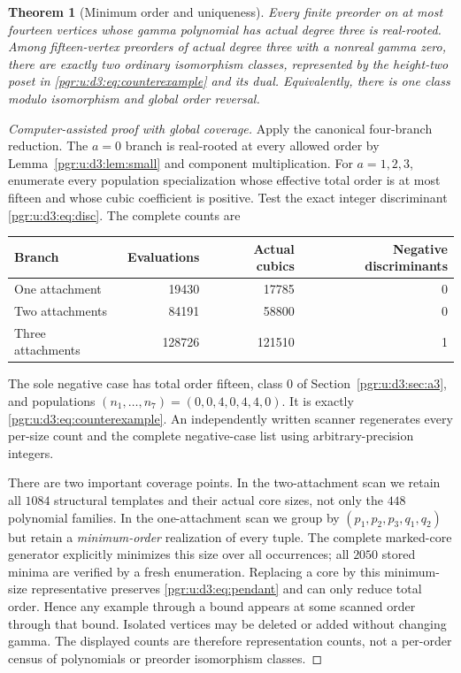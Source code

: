 \documentclass[11pt]{article}
\numberwithin{equation}{section}
\newtheorem{theorem}{Theorem}[section]\newtheorem{lemma}[theorem]{Lemma}\newtheorem{proposition}[theorem]{Proposition}\newtheorem{corollary}[theorem]{Corollary}
\theoremstyle{definition}\newtheorem{definition}[theorem]{Definition}\newtheorem{remark}[theorem]{Remark}
\begin{document}
\begin{theorem}[Minimum order and uniqueness]\label{pgr:u:d3:thm:minimum}
Every finite preorder on at most fourteen vertices whose gamma polynomial has actual degree three is real-rooted. Among fifteen-vertex preorders of actual degree three with a nonreal gamma zero, there are exactly two ordinary isomorphism classes, represented by the height-two poset in \eqref{pgr:u:d3:eq:counterexample} and its dual. Equivalently, there is one class modulo isomorphism and global order reversal.
\end{theorem}
\begin{proof}[Computer-assisted proof with global coverage]
Apply the canonical four-branch reduction. The $a=0$ branch is real-rooted at every allowed order by Lemma~\ref{pgr:u:d3:lem:small} and component multiplication. For $a=1,2,3$, enumerate every population specialization whose effective total order is at most fifteen and whose cubic coefficient is positive. Test the exact integer discriminant \eqref{pgr:u:d3:eq:disc}. The complete counts are
\begin{center}
\begin{tabular}{lrrr}
\toprule
Branch & Evaluations & Actual cubics & Negative discriminants\\\midrule
One attachment & 19430 & 17785 & 0\\
Two attachments & 84191 & 58800 & 0\\
Three attachments & 128726 & 121510 & 1\\\bottomrule
\end{tabular}
\end{center}
The sole negative case has total order fifteen, class 0 of Section~\ref{pgr:u:d3:sec:a3}, and populations $(n_1,\ldots,n_7)=(0,0,4,0,4,4,0)$. It is exactly \eqref{pgr:u:d3:eq:counterexample}. An independently written scanner regenerates every per-size count and the complete negative-case list using arbitrary-precision integers.

There are two important coverage points. In the two-attachment scan we retain all $1084$ structural templates and their actual core sizes, not only the $448$ polynomial families. In the one-attachment scan we group by $(p_1,p_2,p_3,q_1,q_2)$ but retain a \emph{minimum-order} realization of every tuple. The complete marked-core generator explicitly minimizes this size over all occurrences; all $2050$ stored minima are verified by a fresh enumeration. Replacing a core by this minimum-size representative preserves \eqref{pgr:u:d3:eq:pendant} and can only reduce total order. Hence any example through a bound appears at some scanned order through that bound. Isolated vertices may be deleted or added without changing gamma. The displayed counts are therefore representation counts, not a per-order census of polynomials or preorder isomorphism classes.


\end{proof}
\end{document}

